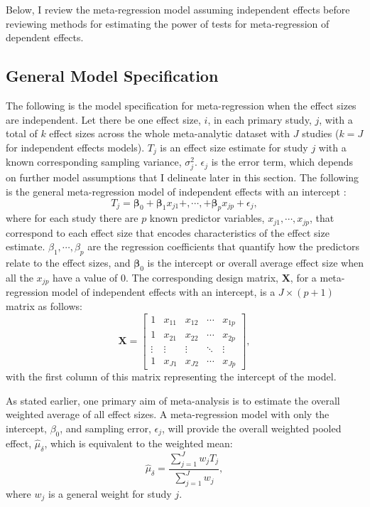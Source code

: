 Below, I review the meta-regression model assuming independent effects before reviewing methods for estimating the power of tests for meta-regression of dependent effects.  

\subsection{General Model Specification}
The following is the model specification for meta-regression when the effect sizes are independent. Let there be one effect size, $i$, in each primary study, $j$, with a total of $k$ effect sizes across the whole meta-analytic dataset with $J$ studies ($k = J$ for independent effects models). $T_j$ is an effect size estimate for study $j$ with a known corresponding sampling variance, $\sigma_j^2$. $\epsilon_j$ is the error term, which depends on further model assumptions that I delineate later in this section.
The following is the general meta-regression model of independent effects with an intercept \autocite{cooper2019}:
\begin{equation} \label{eq:meta-regression independent}
T_j =  \mathbf{\beta}_0 + \mathbf{\beta}_1x_{j1} +, \cdots,+ \mathbf{\beta}_px_{jp} + \epsilon_j,
\end{equation}
where for each study there are $p$ known predictor variables, $x_{j1}, \cdots, x_{jp}$, that correspond to each effect size that encodes characteristics of the effect size estimate. $\beta_1, \cdots, \beta_p$ are the regression coefficients that quantify how the predictors relate to the effect sizes, and $\mathbf{\beta}_0$ is the intercept or overall average effect size when all the $x_{jp}$ have a value of $0$. The corresponding design matrix, $\mathbf{X}$, for a meta-regression model of independent effects with an intercept, is a $J \times (p+1)$ matrix as follows:
\begin{equation}
    \mathbf{X} = \begin{bmatrix}
    1 & x_{11} & x_{12}  &\cdots & x_{1p} \\
    1 & x_{21} & x_{22} & \cdots & x_{2p}\\
    \vdots & \vdots & \vdots & \ddots & \vdots\\
    1 & x_{J1} & x_{J2} & \cdots & x_{Jp}
    \end{bmatrix},
    \nonumber
\end{equation}
with the first column of this matrix representing the intercept of the model. 

As stated earlier, one primary aim of meta-analysis is to estimate the overall weighted average of all effect sizes. A meta-regression model with only the intercept, $\beta_0$, and sampling error, $\epsilon_j$,  will provide the overall weighted pooled effect, $\hat{\mu}_{\delta}$,  which is equivalent to the weighted mean:
\begin{equation}
\label{model_avg_effect}
    \hat{\mu}_{\delta} = \frac{\sum_{j=1}^Jw_j T_j}{\sum_{j=1}^Jw_j},
\end{equation} 
where $w_j$ is a general weight for study $j$.

